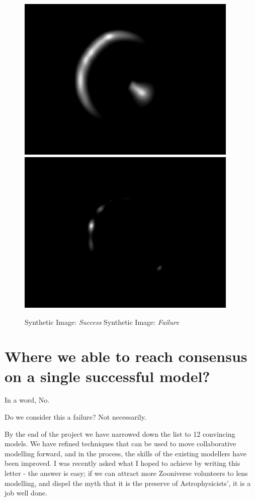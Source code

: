 \documentclass{article}
\begin{document}
\begin{figure}
\centering
\includegraphics[width=300pt]{fig/simsModeling-fig008.png}
\includegraphics[width=300pt]{fig/simsModeling-fig009.png}
\caption{Synthetic Image: {\color{color02} \emph{Success}}
  Synthetic Image: {\color{color02} \emph{Failure}}}
\end{figure}


\section{Where we able to reach consensus on a single successful model?}

In a word, No.

Do we consider this a failure? Not necessarily. 

By the end of the project we have narrowed down the list to 12 convincing models. 
We have refined techniques that can be used to move collaborative modelling forward, 
and in the process, the skills of the existing modellers have been improved. I 
was recently asked what I hoped to achieve by writing this letter - the answer 
is easy; if we can attract more Zooniverse volunteers to lens modelling, and dispel 
the myth that it is the preserve of Astrophysicists', it is a job well done. 
\end{document}
